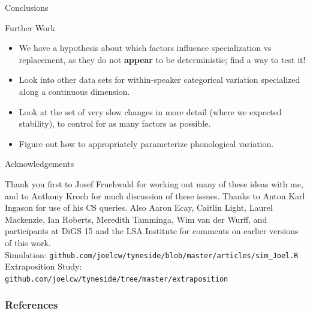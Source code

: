 \documentclass[hyperref={pdfpagelabels=false}]{beamer}
\begin{document}
\begin{frame}{Conclusions}
	\begin{block}{Further Work}
		\begin{itemize}
			\item We have a hypothesis about which factors influence specialization vs replacement, as they do not \textbf{appear} to be deterministic; find a way to test it!
			\item Look into other data sets for within-speaker categorical variation specialized along a continuous dimension.
			\item Look at the set of very slow changes in more detail (where we expected stability), to control for as many factors as possible.
			\item Figure out how to appropriately parameterize phonological variation.
		\end{itemize}
	\end{block}

\end{frame}

\begin{frame}{Acknowledgements}
\begin{center}
Thank you first to Josef Fruehwald for working out many of these ideas with me, and to Anthony Kroch for much discussion of these issues. Thanks to Anton Karl Ingason for use of his CS queries. Also Aaron Ecay, Caitlin Light, Laurel Mackenzie, Ian Roberts, Meredith Tamminga, Wim van der Wurff, and participants at DiGS 15 and the LSA Institute for comments on earlier versions of this work. 
\vspace{5mm}\\
Simulation: \texttt{github.com/joelcw/tyneside/blob/master/articles/sim\_Joel.R}
\vspace{1mm}\\
Extraposition Study: \texttt{github.com/joelcw/tyneside/tree/master/extraposition}
\end{center}
\end{frame}


\begin{frame}[allowframebreaks]
\frametitle{References}
\newcommand*{\newblock}{natbib}


\end{frame}
\end{document}
